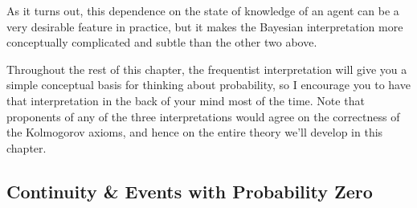 \par
As it turns out, this dependence on the state of knowledge of an agent can be a very desirable feature in practice, but it makes the Bayesian interpretation more conceptually complicated and subtle than the other two above.
\par
Throughout the rest of this chapter, the frequentist interpretation will give you a simple conceptual basis for thinking about probability, so I encourage you to have that interpretation in the back of your mind most of the time. Note that proponents of any of the three interpretations would agree on the correctness of the Kolmogorov axioms, and hence on the entire theory we'll develop in this chapter.

\subsection*{Continuity \& Events with Probability Zero}

